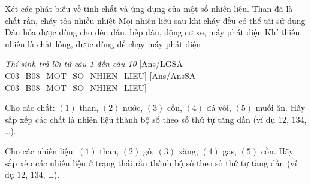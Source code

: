 \documentclass[Main.tex]{subfiles}
\begin{document}
\begin{ex}%
	Xét các phát biểu về tính chất và ứng dụng của một số nhiên liệu.
	\choiceTF
	{\True Than đá là chất rắn, cháy tỏa nhiều nhiệt}
	{Mọi nhiên liệu sau khi cháy đều có thể tái sử dụng}
	{\True Dầu hỏa được dùng cho đèn dầu, bếp dầu, động cơ xe, máy phát điện}
	{Khí thiên nhiên là chất lỏng, được dùng để chạy máy phát điện}
\end{ex}

\textit{\large Thí sinh trả lời từ câu 1 đến câu 10}
[Ans/LGSA-C03_B08_MOT_SO_NHIEN_LIEU]
[Ans/AnsSA-C03_B08_MOT_SO_NHIEN_LIEU]
\setcounter{ex}{0}

\begin{ex}%
	Cho các chất: $(1)$ than, $(2)$ nước, $(3)$ cồn, $(4)$ đá vôi, $(5)$ muối ăn. Hãy sắp xếp các chất là nhiên liệu thành bộ số theo số thứ tự tăng dần (ví dụ $12$, $134$, …).
\end{ex}

\begin{ex}%
	Cho các nhiên liệu: $(1)$ than, $(2)$ gỗ, $(3)$ xăng, $(4)$ gas, $(5)$ cồn. Hãy sắp xếp các nhiên liệu ở trạng thái rắn thành bộ số theo số thứ tự tăng dần (ví dụ $12$, $134$, …).
\end{ex}
\end{document}
